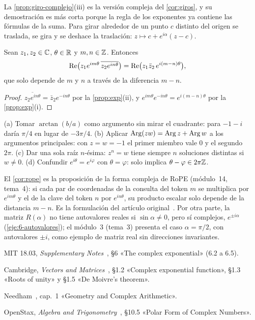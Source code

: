 La \cref{prop:giro-complejo}(iii) es la versión compleja del \cref{cor:giros}, y su demostración es más corta porque la regla de los exponentes ya contiene las fórmulas de la suma. Para girar alrededor de un punto $c$ distinto del origen se traslada, se gira y se deshace la traslación: $z\mapsto c+e^{i\alpha}(z-c)$.

\begin{corolario}\label{cor:rope}
Sean $z_1,z_2\in\mathbb{C}$, $\theta\in\mathbb{R}$ y $m,n\in\mathbb{Z}$. Entonces
\[
\operatorname{Re}\bigl(z_1e^{im\theta}\,\overline{z_2e^{in\theta}}\bigr)=\operatorname{Re}\bigl(z_1\bar z_2\,e^{i(m-n)\theta}\bigr),
\]
que solo depende de $m$ y $n$ a través de la diferencia $m-n$.
\end{corolario}

\begin{proof}
$\overline{z_2e^{in\theta}}=\bar z_2e^{-in\theta}$ por la \cref{prop:exp}(ii), y $e^{im\theta}e^{-in\theta}=e^{i(m-n)\theta}$ por la \cref{prop:exp}(i).
\end{proof}

\begin{observacion}
(a) Tomar $\arctan(b/a)$ como argumento sin mirar el cuadrante: para $-1-i$ daría $\pi/4$ en lugar de $-3\pi/4$. (b) Aplicar $\operatorname{Arg}(zw)=\operatorname{Arg} z+\operatorname{Arg} w$ a los argumentos principales: con $z=w=-1$ el primer miembro vale $0$ y el segundo $2\pi$. (c) Dar una sola raíz $n$-ésima: $z^{n}=w$ tiene siempre $n$ soluciones distintas si $w\ne0$. (d) Confundir $e^{i\theta}=e^{i\varphi}$ con $\theta=\varphi$: solo implica $\theta-\varphi\in2\pi\mathbb{Z}$.
\end{observacion}

\begin{observacion}
El \cref{cor:rope} es la proposición de la forma compleja de RoPE (módulo~14, tema~4): si cada par de coordenadas de la consulta del token $m$ se multiplica por $e^{im\theta}$ y el de la clave del token $n$ por $e^{in\theta}$, su producto escalar solo depende de la distancia $m-n$. Es la formulación del artículo original~\cite[§3.2]{roformer}. Por otra parte, la matriz $R(\alpha)$ no tiene autovalores reales si $\sin\alpha\ne0$, pero sí complejos, $e^{\pm i\alpha}$ (\cref{eje:6-autovalores}); el módulo~3 (tema~3) presenta el caso $\alpha=\pi/2$, con autovalores $\pm i$, como ejemplo de matriz real sin direcciones invariantes.
\end{observacion}

\begin{lecturas}
\item MIT 18.03, \emph{Supplementary Notes}~\cite{mit1803}, §6 «The complex exponential» (6.2 a 6.5).
\item Cambridge, \emph{Vectors and Matrices}~\cite{cambvm}, §1.2 «Complex exponential function», §1.3 «Roots of unity» y §1.5 «De Moivre's theorem».
\item Needham~\cite{needham}, cap.~1 «Geometry and Complex Arithmetic».
\item OpenStax, \emph{Algebra and Trigonometry}~\cite{osat}, §10.5 «Polar Form of Complex Numbers».
\end{lecturas}

